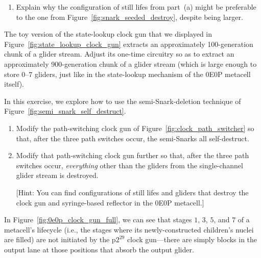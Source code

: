 \begin{multicols}{2}
\begin{problemstar}
\begin{enumerate}[label=\bf\color{ocre}(\alph*)]
			\item Explain why the configuration of still lifes from part~(a) might be preferable to the one from Figure~\ref{fig:snark_seeded_destroy}, despite being larger.
		\end{enumerate}
	\end{problemstar}


	\mfilbreak
	
	
	\begin{problem}\label{exer:0e0p_state_lookup_wider} 
		The toy version of the state-lookup clock gun that we displayed in Figure~\ref{fig:state_lookup_clock_gun} extracts an approximately 100-generation chunk of a glider stream. Adjust its one-time circuitry so as to extract an approximately 900-generation chunk of a glider stream (which is large enough to store $0$--$7$ gliders, just like in the state-lookup mechanism of the 0E0P metacell itself).
	\end{problem}


	\mfilbreak
	
	
	\begin{problemstar}\label{exer:0e0p_clock_gun_destroy}
		In this exercise, we explore how to use the semi-Snark-deletion technique of Figure~\ref{fig:semi_snark_self_destruct}.\smallskip
		
		\begin{enumerate}[label=\bf\color{ocre}(\alph*)]
			\item {} Modify the path-switching clock gun of Figure~\ref{fig:clock_path_switcher} so that, after the three path switches occur, the semi-Snarks all self-destruct.
			
			\item {} Modify that path-switching clock gun further so that, after the three path switches occur, \emph{everything} other than the gliders from the single-channel glider stream is destroyed.
			
			[Hint: You can find configurations of still lifes and gliders that destroy the clock gun and syringe-based reflector in the 0E0P metacell.]
		\end{enumerate}
	\end{problemstar}


	\mfilbreak
	
	
	\begin{problem}\label{exer:0e0p_why_blocks_clock_lane} 
		In Figure~\ref{fig:0e0p_clock_gun_full}, we can see that stages $1$, $3$, $5$, and $7$ of a metacell's lifecycle (i.e., the stages where its newly-constructed children's nuclei are filled) are not initiated by the p$2^{29}$ clock gun---there are simply blocks in the output lane at those positions that absorb the output glider.
		

\end{problem}
\end{multicols}
